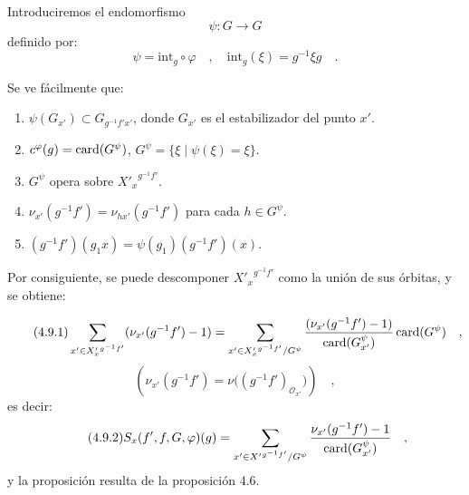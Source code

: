\medskip

\begin{prooftext}[Demostración]
Introduciremos el endomorfismo
\[
\psi : G \longrightarrow G
\]
definido por:
\[
\psi = \mathrm{int}_g \circ \varphi \quad , \quad \mathrm{int}_g(\xi) = g^{-1}\xi g \quad .
\]

Se ve fácilmente que:
\begin{enumerate}
\item[i)] $\psi(G_{x'}) \subset G_{g^{-1}f'x'}$, donde $G_{x'}$ es el estabilizador del punto $x'$.
\item[ii)] $c^\varphi(g) = \operatorname{card}(G^\psi)$, $G^\psi = \{ \xi \mid \psi(\xi) = \xi \}$.
\item[iii)] $G^\psi$ opera sobre ${X'_x}^{g^{-1}f'}$.
\item[iv)] $\nu_{x'}(g^{-1}f') = \nu_{hx'}(g^{-1}f')$ para cada $h \in G^\psi$.
\item[v)] $(g^{-1}f')(g_1x) = \psi(g_1)(g^{-1}f')(x)$.
\end{enumerate}

Por consiguiente, se puede descomponer ${X'_x}^{g^{-1}f'}$ como la unión de sus órbitas, y se obtiene:

\begin{equation}\tag{4.9.1}
\sum_{x' \in {X'_x}^{g^{-1}f'}} (\nu_{x'}(g^{-1}f') - 1) = \sum_{x' \in {X'_x}^{g^{-1}f'}/G^\psi} \frac{(\nu_{x'}(g^{-1}f') - 1)}{\operatorname{card}(G^\psi_{x'})} \operatorname{card}(G^\psi) \quad ,
\end{equation}
\[
(\nu_{x'}(g^{-1}f')=\nu\bigl((g^{-1}f')_{\mathcal{O}_{x'}}\bigr)) \quad ,
\]
es decir:
\begin{equation}\tag{4.9.2}
S_x(f',f,G,\varphi)(g)=\sum_{x' \in {X'}^{g^{-1}f'}/G^\psi}
\frac{\nu_{x'}(g^{-1}f')-1}{\operatorname{card}(G^\psi_{x'})} \quad ,
\end{equation}
y la proposición resulta de la proposición 4.6.
\end{prooftext}
